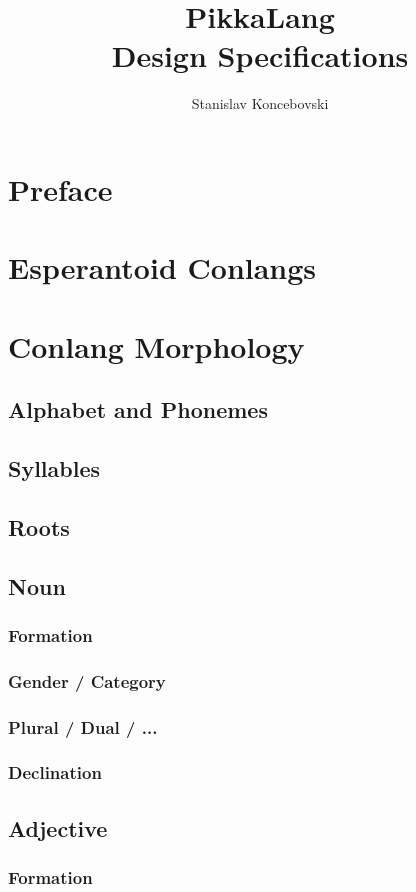 \documentclass[12pt,a4paper]{article}
\author{Stanislav Koncebovski}
\title{PikkaLang\\Design Specifications}
\begin{document}
\maketitle

\section{Preface}
\section{Esperantoid Conlangs}
\section{Conlang Morphology}
	\subsection{Alphabet and Phonemes}
	\subsection{Syllables}
	\subsection{Roots}
	\subsection{Noun}
		\subsubsection{Formation}
		\subsubsection{Gender / Category}
		\subsubsection{Plural / Dual / ...}
		\subsubsection{Declination}
		
	\subsection{Adjective}
		\subsubsection{Formation}
\end{document}
